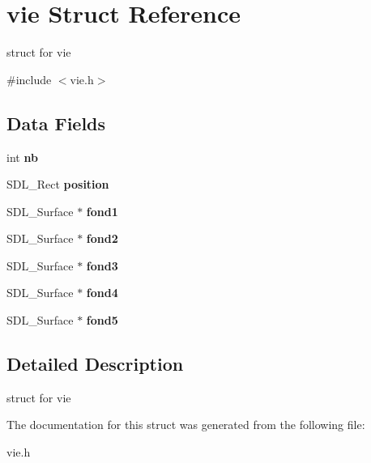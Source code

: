 \hypertarget{structvie}{}\section{vie Struct Reference}
\label{structvie}


struct for vie  




{\ttfamily \#include $<$vie.\+h$>$}

\subsection*{Data Fields}
\begin{DoxyCompactItemize}
\item 
\mbox{\label{structvie_a02356445cb49a7290950ab15cebccdd9}} 
int {\bfseries nb}
\item 
\mbox{\label{structvie_a916050892cf1e7b8039952dcafa44825}} 
S\+D\+L\+\_\+\+Rect {\bfseries position}
\item 
\mbox{\label{structvie_a7616ae8ecc97b7fb2d92be6a858014ad}} 
S\+D\+L\+\_\+\+Surface $\ast$ {\bfseries fond1}
\item 
\mbox{\label{structvie_a6ecad7f4161cb602faa27d2de9e3ee50}} 
S\+D\+L\+\_\+\+Surface $\ast$ {\bfseries fond2}
\item 
\mbox{\label{structvie_a9763ef794bb12262f5826b911d20e42b}} 
S\+D\+L\+\_\+\+Surface $\ast$ {\bfseries fond3}
\item 
\mbox{\label{structvie_a0b08072b8c7ec9e1adfd6e26b4fcb39f}} 
S\+D\+L\+\_\+\+Surface $\ast$ {\bfseries fond4}
\item 
\mbox{\label{structvie_adabeccdf7e33dd53ac6d85a24fc3931d}} 
S\+D\+L\+\_\+\+Surface $\ast$ {\bfseries fond5}
\end{DoxyCompactItemize}


\subsection{Detailed Description}
struct for vie 

The documentation for this struct was generated from the following file\+:\begin{DoxyCompactItemize}
\item 
vie.\+h\end{DoxyCompactItemize}
